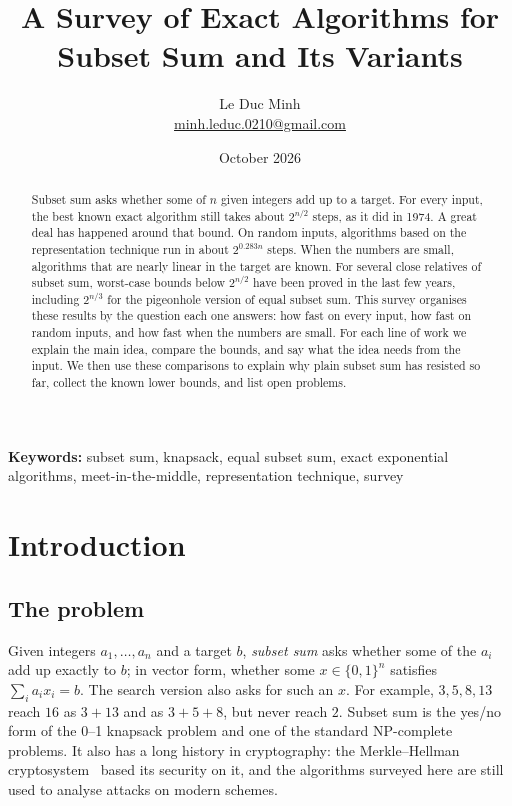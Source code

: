 \documentclass[11pt]{article}
\title{A Survey of Exact Algorithms for Subset Sum and Its Variants}
\author{Le Duc Minh\\
\small\href{mailto:minh.leduc.0210@gmail.com}{minh.leduc.0210@gmail.com}}
\date{October 2026}
\begin{document}
\maketitle
\begin{abstract}
Subset sum asks whether some of $n$ given integers add up to a target. For
every input, the best known exact algorithm still takes about $2^{n/2}$ steps,
as it did in 1974. A great deal has happened around that bound. On random
inputs, algorithms based on the representation technique run in about
$2^{0.283n}$ steps. When the numbers are small, algorithms that are nearly
linear in the target are known. For several close relatives of subset sum,
worst-case bounds below $2^{n/2}$ have been proved in the last few years,
including $2^{n/3}$ for the pigeonhole version of equal subset sum. This
survey organises these results by the question each one answers: how fast on
every input, how fast on random inputs, and how fast when the numbers are
small. For each line of work we explain the main idea, compare the bounds, and
say what the idea needs from the input. We then use these comparisons to
explain why plain subset sum has resisted so far, collect the known lower
bounds, and list open problems.
\end{abstract}
\medskip
\noindent\textbf{Keywords:} subset sum, knapsack, equal subset sum, exact
exponential algorithms, meet-in-the-middle, representation technique, survey

\section{Introduction}

\subsection{The problem}
Given integers $a_1,\dots,a_n$ and a target $b$, \emph{subset sum} asks
whether some of the $a_i$ add up exactly to $b$; in vector form, whether some
$x\in\{0,1\}^n$ satisfies $\sum_ia_ix_i=b$. The search version also asks for
such an $x$. For example, $3,5,8,13$ reach $16$ as $3+13$ and as $3+5+8$, but
never reach $2$. Subset sum is the yes/no form of the 0--1 knapsack problem and
one of the standard NP-complete problems. It also has a long history in
cryptography: the Merkle--Hellman cryptosystem~\cite{mh} based its security on
it, and the algorithms surveyed here are still used to analyse attacks on
modern schemes.
\end{document}

